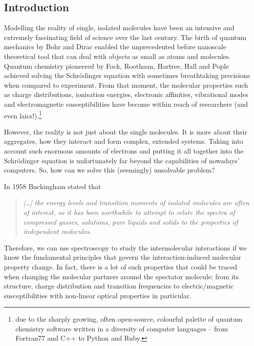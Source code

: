 \documentclass[a4paper,titlepage,twoside,fleqn,12pt]{book}
\begin{document}

\begin{refsection}
    \fancyhead[RE,LO]{\rightmark}
\chapter{Introduction}

Modelling the reality of single, isolated molecules have been 
an intensive and extremely fascinating field of science over the
last century. The birth of quantum mechanics by Bohr and Dirac enabled the unprecedented
before nanoscale theoretical tool that can deal with objects as small
as atoms and molecules. Quantum chemistry pioneered by Fock, Roothaan, Hartree, Hall
and Pople achieved solving the Schr{\"o}dinger
equation with sometimes breathtaking precisions when compared to experiment.
From that moment, the molecular properties such as charge distributions, ionisation energies,
electronic affinities, vibrational modes and electromagnetic susceptibilities
have become within reach of researchers (and even laics!).\footnote{due to the
sharply growing, often open-source, colourful palette of quantum chemistry software
written in a diversity of computer languages -- from Fortran77 and C++ to Python and Ruby.} 

However, the reality is not just about the single molecules. It is more about their aggregates,
how they interact and form complex, extended systems. Taking into account such enormous
amounts of electrons and putting it all together into the Schr{\"o}dinger equation 
is unfortunately far beyond the capabilities of nowadays' computers. So, how can we solve this 
(seemingly) unsolvable problem? 

In 1958 Buckingham stated \citep{Buckingham.ProcRSocLondonA.1958} that
%
\begin{quote}
\emph{
[\ldots] the energy levels and transition moments of isolated molecules are often 
of interest, so it has been worthwhile to attempt to relate the spectra of compressed
gasses, solutions, pure liquids and solids to the properties of independent molecules.
}
\end{quote}
%
Therefore, we can use spectroscopy to study the intermolecular interactions
if we know the fundamental principles that govern the interaction-induced molecular property
change. In fact, there is a lot of such properties that could be traced when changing
the molecular partners around the spectator molecule: from its
structure, charge distribution and transition frequencies to electric\slash{}magnetic 
susceptibilities with non\hyp{}linear optical properties in particular.


\end{refsection}
\end{document}
